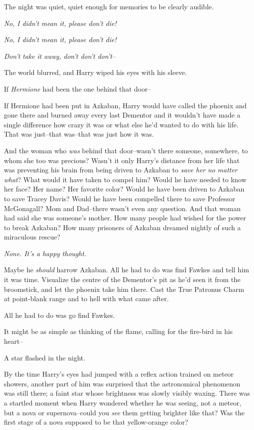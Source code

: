 The night was quiet, quiet enough for memories to be clearly audible.

\emph{No, I didn't mean it, please don't die!}

\emph{No, I didn't mean it, please don't die!}

\emph{Don't take it away, don't don't don't\---}

The world blurred, and Harry wiped his eyes with his sleeve.

If \emph{Hermione} had been the one behind that door\---

If Hermione had been put in Azkaban, Harry would have called the phoenix and gone there and burned away every last Dementor and it wouldn't have made a single difference how crazy it was or what else he'd wanted to do with his life. That was just\---that was\---that was just how it was.

And the woman who \emph{was} behind that door\---wasn't there someone, somewhere, to whom she too was precious? Wasn't it only Harry's distance from her life that was preventing his brain from being driven to Azkaban to \emph{save her no matter what}? What would it have taken to compel him? Would he have needed to know her face? Her name? Her favorite color? Would he have been driven to Azkaban to save Tracey Davis? Would he have been compelled there to save Professor McGonagall? Mom and Dad\---there wasn't even any question. And that woman had said she was someone's mother. How many people had wished for the power to break Azkaban? How many prisoners of Azkaban dreamed nightly of such a miraculous rescue?

\emph{None. It's a happy thought.}

Maybe he \emph{should} harrow Azkaban. All he had to do was find Fawkes and tell him it was time. Visualize the centre of the Dementor's pit as he'd seen it from the broomstick, and let the phoenix take him there. Cast the True Patronus Charm at point-blank range and to hell with what came after.

All he had to do was go find Fawkes.

It might be as simple as thinking of the flame, calling for the fire-bird in his heart\---

A star flashed in the night.

By the time Harry's eyes had jumped with a reflex action trained on meteor showers, another part of him was surprised that the astronomical phenomenon was still there; a faint star whose brightness was slowly visibly waxing. There was a startled moment when Harry wondered whether he was seeing, not a meteor, but a nova or supernova\---could you \emph{see} them getting brighter like that? Was the first stage of a nova supposed to be that yellow-orange color?

